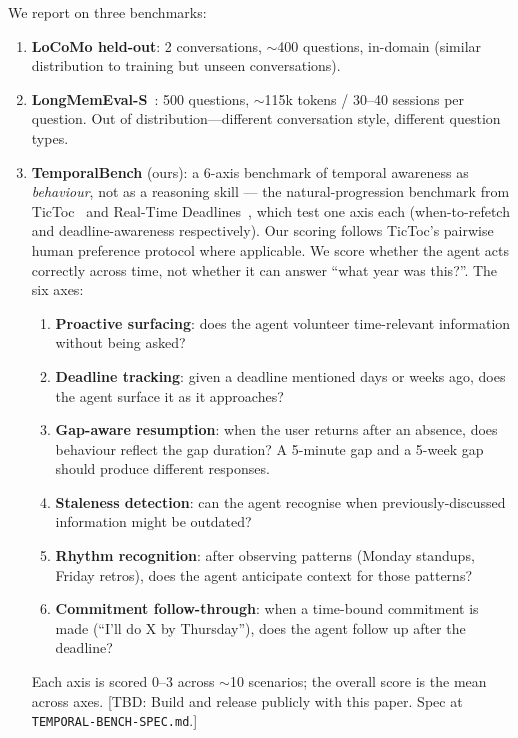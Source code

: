 \documentclass[11pt]{article}
\newcommand{\TBD}[1]{%
  \textcolor{red!80!black}{\textsf{[TBD: #1]}}}
\begin{document}
We report on three benchmarks:
\begin{enumerate}
  \item \textbf{LoCoMo held-out}: 2 conversations, $\sim$400 questions,
    in-domain (similar distribution to training but unseen
    conversations).
  \item \textbf{LongMemEval-S}~\cite{wu2024longmemeval}: 500 questions,
    $\sim$115k tokens / 30--40 sessions per question. Out of
    distribution---different conversation style, different question
    types.
  \item \textbf{TemporalBench} (ours): a 6-axis benchmark of temporal
    awareness as \emph{behaviour}, not as a reasoning skill --- the
    natural-progression benchmark from TicToc~\cite{tictoc2025} and
    Real-Time Deadlines~\cite{realtimedeadlines2026}, which test
    one axis each (when-to-refetch and deadline-awareness
    respectively). Our scoring follows TicToc's pairwise human
    preference protocol where applicable. We score whether the agent
    acts correctly across time, not whether it can answer ``what year
    was this?''. The six axes:
    \begin{enumerate}
      \item \textbf{Proactive surfacing}: does the agent volunteer
        time-relevant information without being asked?
      \item \textbf{Deadline tracking}: given a deadline mentioned days
        or weeks ago, does the agent surface it as it approaches?
      \item \textbf{Gap-aware resumption}: when the user returns after
        an absence, does behaviour reflect the gap duration? A 5-minute
        gap and a 5-week gap should produce different responses.
      \item \textbf{Staleness detection}: can the agent recognise when
        previously-discussed information might be outdated?
      \item \textbf{Rhythm recognition}: after observing patterns
        (Monday standups, Friday retros), does the agent anticipate
        context for those patterns?
      \item \textbf{Commitment follow-through}: when a time-bound
        commitment is made (``I'll do X by Thursday''), does the agent
        follow up after the deadline?
    \end{enumerate}
    Each axis is scored 0--3 across $\sim$10 scenarios; the overall
    score is the mean across axes. \TBD{Build and release publicly with
    this paper. Spec at \texttt{TEMPORAL-BENCH-SPEC.md}.}
\end{enumerate}
\end{document}
